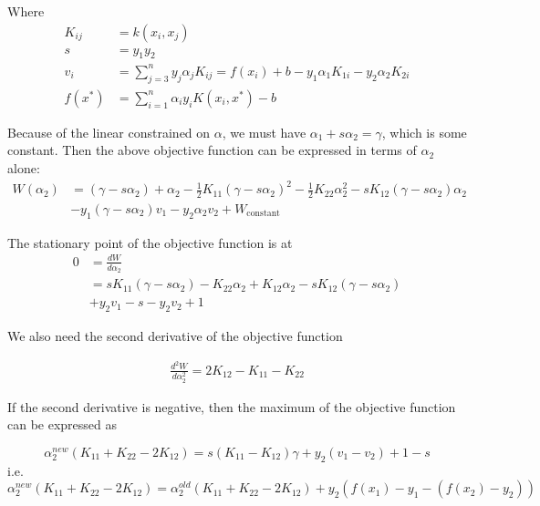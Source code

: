 \documentclass[12pt,oneside,a4paper]{article}
\begin{document}
Where
\begin{equation*}
\begin{aligned}
K_{ij} &= k(x_{i}, x_{j}) \\
s &= y_{1}y_{2} \\
v_{i} &= \sum_{j = 3}^{n}y_{j}\alpha_{j}K_{ij} = f(x_{i}) + b - y_{1}\alpha_{1}K_{1i} - y_{2}\alpha_{2}K_{2i} \\
f(x^*) &= \sum_{i = 1}^{n}\alpha_{i}y_{i}K(x_{i}, x^*) - b
\end{aligned}
\end{equation*}

Because of the linear constrained on $\alpha$, we must have $\alpha_{1} + s\alpha_{2} = \gamma$, which is some constant. Then the above objective function can be expressed in terms of $\alpha_{2}$ alone:
\begin{equation*}
\begin{aligned}
W(\alpha_{2}) &= (\gamma - s\alpha_{2}) + \alpha_{2} - \frac{1}{2}K_{11}(\gamma - s\alpha_{2})^{2} - \frac{1}{2}K_{22}\alpha_{2}^{2} - sK_{12}(\gamma - s\alpha_{2})\alpha_{2} \\
&- y_{1}(\gamma - s\alpha_{2})v_{1} - y_{2}\alpha_{2}v_{2} + W_{\mathrm{constant}}
\end{aligned}
\end{equation*}

The stationary point of the objective function is at
\begin{equation*}
\begin{aligned}
0 &= \frac{dW}{d\alpha_{2}} \\
&= sK_{11}(\gamma - s\alpha_{2}) - K_{22}\alpha_{2} + K_{12}\alpha_{2} - sK_{12}(\gamma - s\alpha_{2}) \\
& + y_{2}v_{1} - s - y_{2}v_{2} + 1
\end{aligned}
\end{equation*}

We also need the second derivative of the objective function

\begin{equation*}
\begin{aligned}
\frac{d^2W}{d\alpha_{2}^2} = 2K_{12} - K_{11} - K_{22}
\end{aligned}
\end{equation*}

If the second derivative is negative, then the maximum of the objective function can be expressed as

\begin{equation*}
\alpha_{2}^{new}(K_{11} + K_{22} - 2K_{12}) = s(K_{11} - K_{12})\gamma + y_{2}(v_1 - v_2) + 1 - s
\end{equation*}
i.e.
\begin{equation*}
\alpha_{2}^{new}(K_{11} + K_{22} - 2K_{12}) = \alpha_{2}^{old}(K_{11} + K_{22} - 2K_{12}) + y_{2}(f(x_{1}) - y_1 - (f(x_{2}) - y_{2}))
\end{equation*}
\end{document}
